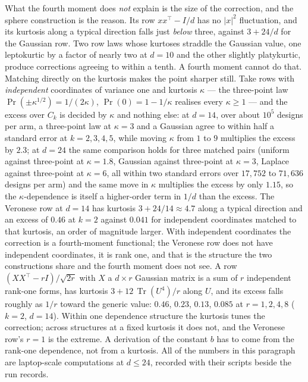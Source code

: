 \documentclass[11pt]{article}
\theoremstyle{definition}
\DeclareMathOperator{\Tr}{Tr}
\newcommand{\numKurtDtwentyfourNmax}{71{,}636}
\newcommand{\numKurtDtwentyfourNmin}{17{,}752}
\begin{document}
What the fourth moment does \emph{not} explain is the size of the correction, and the sphere
construction is the reason. Its row $xx^\top-I/d$ has no $\lvert x\rvert^2$ fluctuation, and its
kurtosis along a typical direction falls just \emph{below} three, against $3+24/d$ for the Gaussian
row. Two row laws whose kurtoses straddle the Gaussian value, one leptokurtic by a factor of nearly
two at $d=10$ and the other slightly platykurtic, produce corrections agreeing to within a tenth. A
fourth moment cannot do that. Matching directly on the kurtosis makes the point sharper still. Take
rows with \emph{independent} coordinates of variance one and kurtosis $\kappa$ --- the three-point
law $\Pr(\pm\kappa^{1/2})=1/(2\kappa)$, $\Pr(0)=1-1/\kappa$ realises every $\kappa\ge1$ --- and the
excess over $C_k$ is decided by $\kappa$ and nothing else: at $d=14$, over about $10^5$ designs per
arm, a three-point law at $\kappa=3$ and a Gaussian agree to within half a standard error at
$k=2,3,4,5$, while moving $\kappa$ from $1$ to $9$ multiplies the excess by $2.3$; at $d=24$ the same
comparison holds for three matched pairs (uniform against three-point at $\kappa=1.8$, Gaussian
against three-point at $\kappa=3$, Laplace against three-point at $\kappa=6$, all within two standard
errors over $\numKurtDtwentyfourNmin$ to $\numKurtDtwentyfourNmax$ designs per arm) and the same
move in $\kappa$ multiplies the
excess by only $1.15$, so the $\kappa$-dependence is itself a higher-order term in $1/d$ than the
excess. The Veronese row at $d=14$ has kurtosis $3+24/14\approx4.7$ along a typical direction and an
excess of $0.46$ at $k=2$ against $0.041$ for independent coordinates matched to that kurtosis, an
order of magnitude larger. With independent coordinates the correction is a fourth-moment functional;
the Veronese row does not have independent coordinates, it is rank one, and that is the structure the
two constructions share and the fourth moment does not see. A row $(XX^\top-rI)/\sqrt{2r}$ with $X$
a $d\times r$ Gaussian matrix is a sum of $r$ independent rank-one forms, has kurtosis
$3+12\,\Tr(U^4)/r$ along $U$, and its excess falls roughly as $1/r$ toward the generic value: $0.46$,
$0.23$, $0.13$, $0.085$ at $r=1,2,4,8$ ($k=2$, $d=14$). Within one dependence structure the kurtosis
tunes the correction; across structures at a fixed kurtosis it does not, and the Veronese row's $r=1$
is the extreme. A derivation of the constant $b$ has to come from the rank-one dependence, not from a
kurtosis. All of the numbers in this paragraph are laptop-scale computations at $d\le24$, recorded
with their scripts beside the run records.
\end{document}

